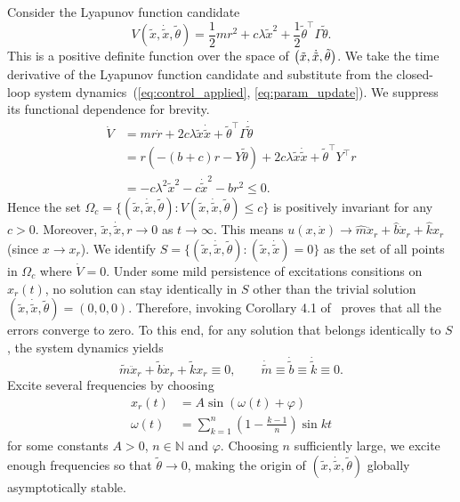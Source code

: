 Consider the Lyapunov function candidate
%
\begin{equation*}
    V(\tilde{x}, \dot{\tilde{x}}, \tilde{\theta}) = \frac{1}{2}mr^2 + 
    c\lambda\tilde{x}^2 + \frac{1}{2}\tilde{\theta}^\top\Gamma\tilde{\theta}.
\end{equation*}
%
This is a positive definite function over the space of $\begin{pmatrix}\tilde{x},
\dot{\tilde{x}}, \tilde{\theta}\end{pmatrix}$. We take the time derivative of the Lyapunov
function candidate and substitute from the closed-loop system
dynamics~(\ref{eq:control_applied}, \ref{eq:param_update}). We suppress its
functional dependence for brevity.
%
\begin{align*}
    \dot{V} &= mr\dot{r} + 2c\lambda \tilde{x}\dot{\tilde{x}} +
    \tilde{\theta}^\top\Gamma\dot{\tilde{\theta}} \\
            &= r\left(-(b+c)r - Y\tilde{\theta}\right) + 2c\lambda
            \tilde{x}\dot{\tilde{x}} + \tilde{\theta}^\top Y^\top r \\
            &= -c\lambda^2\tilde{x}^2 - c\dot{\tilde{x}}^2 - br^2 \leq 0.
\end{align*}
%
Hence the set $\Omega_c = \{(\tilde{x}, \dot{\tilde{x}}, \tilde{\theta}):
V(\tilde{x}, \dot{\tilde{x}}, \tilde{\theta}) \leq c \}$ is positively
invariant for any $c > 0$. Moreover, $\tilde{x}, \dot{\tilde{x}}, r \rightarrow
0$ as $t \rightarrow \infty$. This means $u(x, \dot{x}) \rightarrow
\hat{m}\ddot{x}_r + \hat{b}\dot{x}_r + \hat{k}x_r$ (since $x \rightarrow x_r$).
We identify $S = \{(\tilde{x}, \dot{\tilde{x}}, \tilde{\theta}): (\tilde{x},
\dot{\tilde{x}}) = 0\}$ as the set of all points in $\Omega_c$ where $\dot{V} =
0$. Under some mild persistence of excitations consitions on $x_r(t)$, no
solution can stay identically in $S$ other than the trivial solution
$(\tilde{x}, \dot{\tilde{x}}, \tilde{\theta}) = (0,0,0)$. Therefore, invoking
Corollary 4.1 of~\cite{khalil2015nonlinear} proves that all the errors converge
to zero.
%
To this end, for any solution that belongs identically to $S$, the system
dynamics yields \[ \tilde{m}\ddot{x}_r + \tilde{b}\dot{x}_r + \tilde{k}x_r
\equiv 0, \qquad \dot{\tilde{m}} \equiv \dot{\tilde{b}} \equiv \dot{\tilde{k}}
\equiv 0. \] 
%
Excite several frequencies by choosing 
\begin{align*}
    x_r(t) &= A\sin{\left(\omega(t) + \varphi\right)} \\
    \omega(t) &= \sum_{k=1}^n \left(1-\frac{k-1}{n}\right)\sin{k t}
\end{align*}
%
for some constants $A > 0$, $n \in \mathbb{N}$ and $\varphi$. Choosing $n$
sufficiently large, we excite enough frequencies so that $\tilde{\theta}
\rightarrow 0$, making the origin of $(\tilde{x}, \dot{\tilde{x}},
\tilde{\theta})$ globally asymptotically stable.
